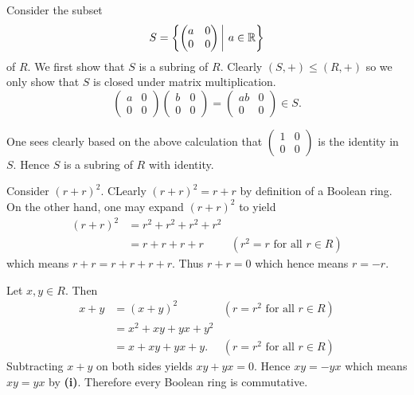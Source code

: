 \begin{questions}
\begin{partquestions}{\roman*}
        \item Consider the subset
        \[
            S = \left\{\begin{pmatrix}a&0\\0&0\end{pmatrix} \vert a \in \R\right\}
        \]
        of $R$. We first show that $S$ is a subring of $R$. Clearly $(S, +) \leq (R, +)$ so we only show that $S$ is closed under matrix multiplication.
        \[
            \begin{pmatrix}a&0\\0&0\end{pmatrix}\begin{pmatrix}b&0\\0&0\end{pmatrix} = \begin{pmatrix}ab&0\\0&0\end{pmatrix} \in S.
        \]

        One sees clearly based on the above calculation that $\begin{pmatrix}1&0\\0&0\end{pmatrix}$ is the identity in $S$. Hence $S$ is a subring of $R$ with identity.
    \end{partquestions}

    \item \begin{partquestions}{\roman*}
        \item Consider $(r+r)^2$. CLearly $(r+r)^2 = r+r$ by definition of a Boolean ring. On the other hand, one may expand $(r+r)^2$ to yield
        \begin{align*}
            (r+r)^2 &= r^2 + r^2 + r^2 + r^2 \\
            &= r + r + r + r & (r^2 = r \text{ for all }r \in R)
        \end{align*}
        which means $r+r = r+r+r+r$. Thus $r+r = 0$ which hence means $r=-r$.

        \item Let $x,y\in R$. Then
        \begin{align*}
            x+y &= (x+y)^2 & (r = r^2 \text{ for all }r \in R)\\
            &= x^2 + xy + yx + y^2\\
            &= x + xy + yx + y. & (r = r^2 \text{ for all }r \in R)
        \end{align*}
        Subtracting $x+y$ on both sides yields $xy +yx = 0$. Hence $xy = -yx$ which means $xy = yx$ by \textbf{(i)}. Therefore every Boolean ring is commutative.
    \end{partquestions}


\end{questions}
